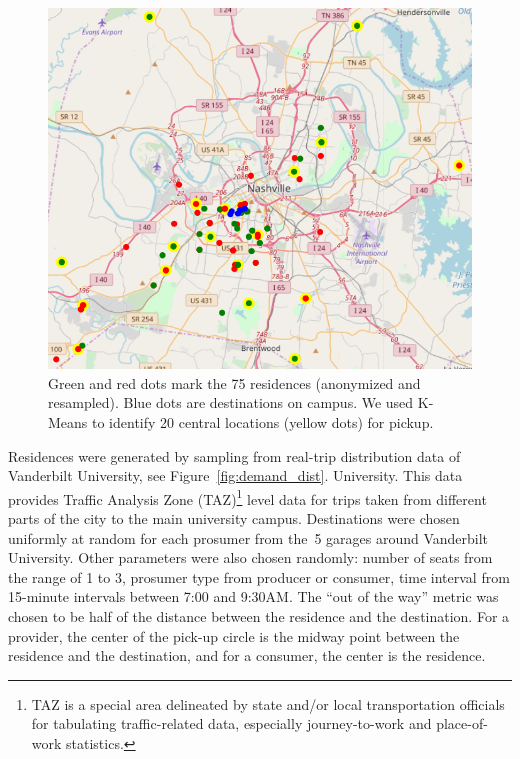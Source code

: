 \begin{figure}[t]
\centering
\includegraphics[width=0.7\columnwidth]{figs/clusters.png}
\caption{
Green and red dots mark the 75 residences (anonymized and resampled). Blue dots are destinations on campus. We used K-Means to identify 20 central locations (yellow dots) for pickup.
}
\label{fig:clusters}
\end{figure}

Residences were generated by sampling from real-trip distribution data of Vanderbilt 
\ifExtended
University, see Figure~\ref{fig:demand_dist}.
\else
University.
\fi
\ifExtended
This data provides Traffic Analysis Zone (TAZ)\footnote{TAZ is a special area delineated by state and/or local transportation officials for tabulating traffic-related data, especially journey-to-work and place-of-work statistics.} level data for trips taken from different parts of the city to the main university campus.
\fi
Destinations were chosen uniformly at random for each prosumer from the~5 garages around Vanderbilt University.
Other parameters were also chosen randomly:  number of seats from the range of 1 to 3,  prosumer type from producer or consumer,  time interval from 15-minute intervals between 7:00 and 9:30AM. The ``out of the way'' metric was chosen to be half of the distance between the residence and the destination. For a provider, the center of the pick-up circle is the midway point between the residence and the destination, and for a consumer,  the center is the residence.

